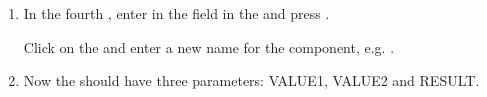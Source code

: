 \begin{enumerate}
\item In the fourth \gdcase{}, enter  in the  field in the \gdpropview{} and press . 

Click on the \gdcompnamesview{} and enter a new name for the component, e.g. .
 
\item Now the  \gdcase{} should have three parameters: VALUE1, VALUE2 and RESULT. 
\end{enumerate}



